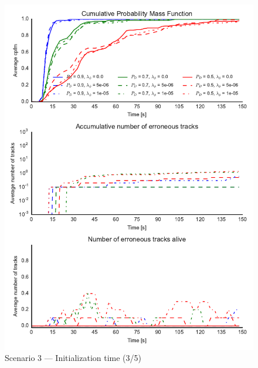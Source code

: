 \begin{figure}
\centering
\includegraphics{Figures/plots/Scenario3_Init-Time(3-5).pdf}
\caption{Scenario 3 --- Initialization time (3/5)}\label{fig:init3_time_3-5}
\end{figure}

